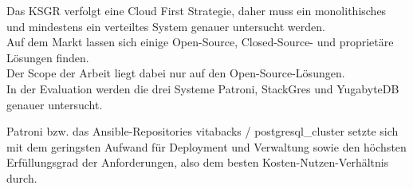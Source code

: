 \documentclass{ksgr_styles}
\begin{document}
\begin{managementsummary}
\begin{flushleft}
            Das KSGR verfolgt eine Cloud First Strategie, daher muss ein monolithisches und mindestens ein verteiltes System genauer untersucht werden.\\
            Auf dem Markt lassen sich einige Open-Source, Closed-Source- und proprietäre Lösungen finden.\\
            Der Scope der Arbeit liegt dabei nur auf den Open-Source-Lösungen.\\
            In der Evaluation werden die drei Systeme Patroni, StackGres und YugabyteDB genauer untersucht.
        \end{flushleft}
        \begin{flushleft}
            Patroni bzw. das \Gls{Ansible}-Repositories vitabacks / postgresql\_cluster setzte sich mit dem geringsten Aufwand für Deployment und Verwaltung sowie den höchsten Erfüllungsgrad der Anforderungen, also dem besten Kosten-Nutzen-Verhältnis durch.

\end{flushleft}
\end{managementsummary}
\end{document}
